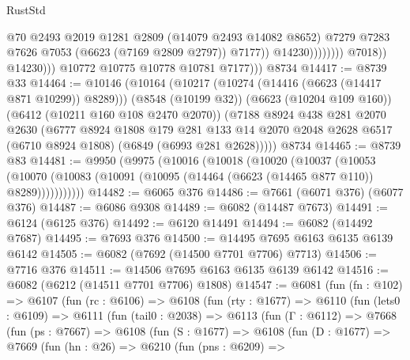 \begin{lexlean}{RustStd}
\begin{coremodule}
                                        @70
                                        @2493
                                        @2019
                                        @1281
                                        @2809
                                        (@14079 @2493 @14082 @8652)
                                        @7279
                                        @7283
                                        @7626
                                        @7053
                                        (@6623 (@7169 @2809 @2797))
                                        @7177))
                                    @14230))))))))
                    @7018))
                @14230)))
          @10772
          @10775
          @10778
          @10781
          @7177)))
    @8734
@14417 := @8739 @33
@14464 := @10146
    (@10164
      (@10217 (@10274 (@14416 (@6623 (@14417 @871 @10299)) @8289)))
      (@8548 (@10199 @32))
      (@6623 (@10204 @109 @160))
      (@6412 (@10211 @160 @108 @2470 @2070))
      (@7188
        @8924
        @438
        @281
        @2070
        @2630
        (@6777
          @8924
          @1808
          @179
          @281
          @133
          @14
          @2070
          @2048
          @2628
          @6517
          (@6710 @8924 @1808)
          (@6849 (@6993 @281 @2628)))))
    @8734
@14465 := @8739 @83
@14481 := @9950
    (@9975
      (@10016
        (@10018
          (@10020
            (@10037
              (@10053
                (@10070 (@10083 (@10091 (@10095 (@14464 (@6623 (@14465 @877 @110)) @8289)))))))))))
@14482 := @6065 @376
@14486 := @7661 (@6071 @376) (@6077 @376)
@14487 := @6086 @9308
@14489 := @6082 (@14487 @7673)
@14491 := @6124 (@6125 @376)
@14492 := @6120 @14491
@14494 := @6082 (@14492 @7687)
@14495 := @7693 @376
@14500 := @14495 @7695 @6163 @6135 @6139 @6142
@14505 := @6082 (@7692 (@14500 @7701 @7706) @7713)
@14506 := @7716 @376
@14511 := @14506 @7695 @6163 @6135 @6139 @6142
@14516 := @6082 (@6212 (@14511 @7701 @7706) @1808)
@14547 := @6081
    (fun (fn : @102) =>
    @6107
      (fun (rc : @6106) =>
      @6108
        (fun (rty : @1677) =>
        @6110
          (fun (lets0 : @6109) =>
          @6111
            (fun (tail0 : @2038) =>
            @6113
              (fun (Γ : @6112) =>
              @7668
                (fun (ps : @7667) =>
                @6108
                  (fun (S : @1677) =>
                  @6108
                    (fun (D : @1677) =>
                    @7669
                      (fun (hn : @26) =>
                      @6210
                        (fun (pns : @6209) =>

\end{coremodule}
\end{lexlean}
